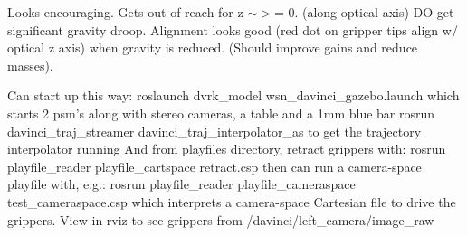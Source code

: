 Looks encouraging. Gets out of reach for z $\sim$$>$= 0. (along optical axis) D\-O get significant gravity droop. Alignment looks good (red dot on gripper tips align w/ optical z axis) when gravity is reduced. (Should improve gains and reduce masses).

Can start up this way\-: {\ttfamily roslaunch dvrk\-\_\-model wsn\-\_\-davinci\-\_\-gazebo.\-launch} which starts 2 psm's along with stereo cameras, a table and a 1mm blue bar {\ttfamily rosrun davinci\-\_\-traj\-\_\-streamer davinci\-\_\-traj\-\_\-interpolator\-\_\-as} to get the trajectory interpolator running And from playfiles directory, retract grippers with\-: {\ttfamily rosrun playfile\-\_\-reader playfile\-\_\-cartspace retract.\-csp} then can run a camera-\/space playfile with, e.\-g.\-: {\ttfamily rosrun playfile\-\_\-reader playfile\-\_\-cameraspace test\-\_\-cameraspace.\-csp} which interprets a camera-\/space Cartesian file to drive the grippers. View in rviz to see grippers from /davinci/left\-\_\-camera/image\-\_\-raw 